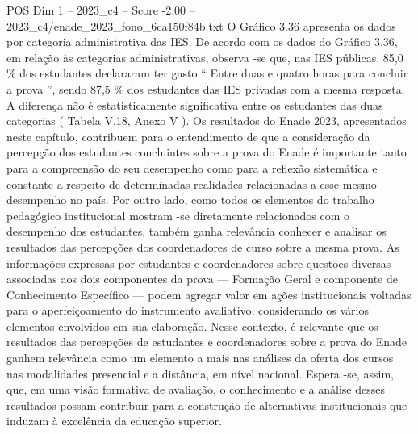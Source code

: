 \begin{textsample}{POS Dim 1 – 2023\_c4 – Score -2.00 – 2023\_c4/enade\_2023\_fono\_6ca150f84b.txt}
O Gráfico 3.36 apresenta os dados por categoria administrativa das IES.
De acordo com os dados do Gráfico 3.36, em relação às categorias administrativas, observa -se que, nas IES públicas, 85,0 \% dos estudantes declararam ter gasto “ Entre duas e quatro horas para concluir a prova ”, sendo 87,5 \% dos estudantes das IES privadas com a mesma resposta.
A diferença não é estatisticamente significativa entre os estudantes das duas categorias ( Tabela V.18, Anexo V ).
Os resultados do Enade 2023, apresentados neste capítulo, contribuem para o entendimento de que a consideração da percepção dos estudantes concluintes sobre a prova do Enade é importante tanto para a compreensão do seu desempenho como para a reflexão sistemática e constante a respeito de determinadas realidades relacionadas a esse mesmo desempenho no país.
Por outro lado, como todos os elementos do trabalho pedagógico institucional mostram -se diretamente relacionados com o desempenho dos estudantes, também ganha relevância conhecer e analisar os resultados das percepções dos coordenadores de curso sobre a mesma prova.
As informações expressas por estudantes e coordenadores sobre questões diversas associadas aos dois componentes da prova — Formação Geral e componente de Conhecimento Específico — podem agregar valor em ações institucionais voltadas para o aperfeiçoamento do instrumento avaliativo, considerando os vários elementos envolvidos em sua elaboração.
Nesse contexto, é relevante que os resultados das percepções de estudantes e coordenadores sobre a prova do Enade ganhem relevância como um elemento a mais nas análises da oferta dos cursos nas modalidades presencial e a distância, em nível nacional.
Espera -se, assim, que, em uma visão formativa de avaliação, o conhecimento e a análise desses resultados possam contribuir para a construção de alternativas institucionais que induzam à excelência da educação superior.

\end{textsample}
